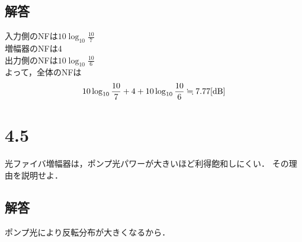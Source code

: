 \subsection*{解答}
\noindent
入力側のNFは$10\log_{10}{\frac{10}{7}}$\\
増幅器のNFは4\\
出力側のNFは$10\log_{10}{\frac{10}{6}}$\\
よって，全体のNFは
\begin{eqnarray*}
    10\log_{10}{\frac{10}{7}}+4+10\log_{10}{\frac{10}{6}}\fallingdotseq 7.77[{\rm dB}]
\end{eqnarray*}

\section*{4.5}
光ファイバ増幅器は，ポンプ光パワーが大きいほど利得飽和しにくい．
その理由を説明せよ．

\subsection*{解答}
ポンプ光により反転分布が大きくなるから．